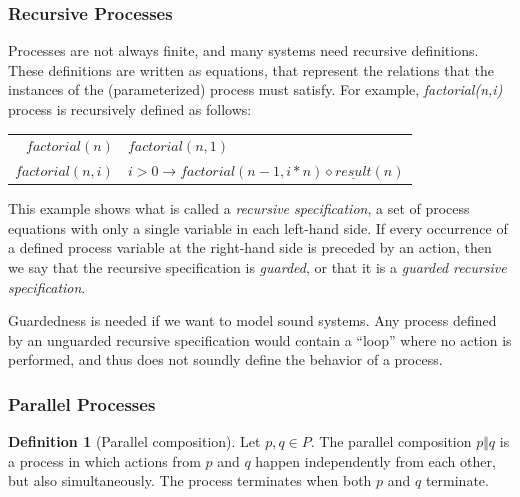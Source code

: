 \documentclass[11pt]{article}
\theoremstyle{definition}
\newtheorem{definition}{Definition}
\theoremstyle{plain}
\begin{document}
\subsubsection{Recursive Processes}
Processes are not always finite, and many systems need recursive definitions. These definitions are written as equations, that represent the relations that the instances of the (parameterized) process must satisfy. For example, \textit{factorial(n,i)} process is recursively defined as follows:
\begin{table}[H]
	\centering
	\begin{tabular}{  r@{ = }l  }
		$ factorial(n) $ & $ factorial(n,1) $ \\
		$ factorial(n,i) $ & $ i > 0 \rightarrow factorial(n-1,i*n) \diamond \underline{result}(n) $
	\end{tabular}
\end{table}

This example shows what is called a \textit{recursive specification}, a set of process equations with only a single variable in each left-hand side. If every occurrence of a defined process variable at the right-hand side is preceded by an action, then we say that the recursive specification is \textit{guarded}, or that it is a \textit{guarded recursive specification}.

Guardedness is needed if we want to model sound systems. Any process defined by an unguarded recursive specification would contain a ``loop'' where no action is performed, and thus does not soundly define the behavior of a process.


\subsubsection{Parallel Processes}
\begin{definition} [Parallel composition]
	Let $ p, q \in P $. The parallel composition $ p \Vert q $ is a process in which actions from $ p $ and $ q $ happen independently from each other, but also simultaneously. The process terminates when both $ p $ and $ q $ terminate.
\end{definition}
\end{document}
